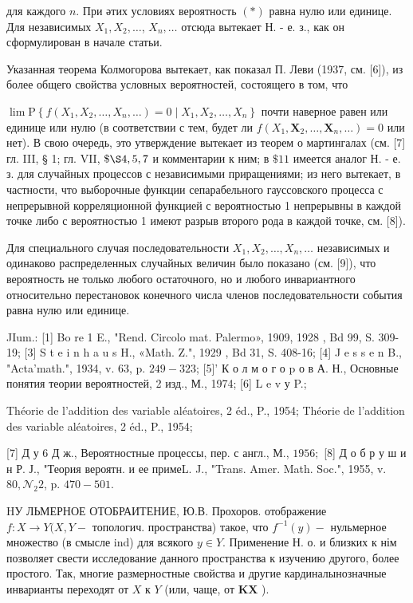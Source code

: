 \documentclass[10pt]{article}
\begin{document}
для каждого $n$. При әтих условиях вероятность $(*)$ равна нулю или единице. Для независимых $X_{1}, X_{2}, \ldots$, $X_{n}, \ldots$ отсюда вытекает Н. - е. з., как он сформулирован в начале статьи.



Указанная теорема Колмогорова вытекает, как показал П. Леви (1937, см. [6]), из более общего свойства условных вероятностей, состоящего в том, что



$\lim \mathrm{P}\left\{f\left(X_{1}, X_{2}, \ldots, X_{n}, \ldots\right)=0 \mid X_{1}, X_{2}, \ldots, X_{n}\right\}$ почти наверное равен или единице или нулю (в соответствии с тем, будет ли $f\left(X_{1}, \boldsymbol{X}_{2}, \ldots, \boldsymbol{X}_{n}, \ldots\right)=0$ или нет). В свою очередь, это утверждение вытекает из теорем о мартингалах (см. [7] гл. III, § 1; гл. VII, $\$ \S 4,5,7$ и комментарии к ним; в $\$ 11$ имеется аналог Н. - е. з. для случайных процессов с независимыми приращениями; из него вытекает, в частности, что выборочные функции сепарабельного гауссовского процесса с непрерывной корреляционной функцией с вероятностью 1 непрерывны в каждой точке либо с вероятностью 1 имеют разрыв второго рода в каждой точке, см. [8]).



Для специального случая последовательности $X_{1}, X_{2}, \ldots, X_{n}, \ldots$ независимых и одинаково распределенных случайных величин было показано (см. [9]), что вероятность не только любого остаточного, но и любого инвариантного относительно перестановок конечного числа членов последовательности события равна нулю или единице.



JIum.: [1] Bo re 1 E., "Rend. Circolo mat. Palermo», 1909, 1928 , Bd 99, S. 309-19; [3] S t e i n h a u s H., «Math. Z.", 1929 , Bd 31, S. 408-16; [4] J e s s e n B., "Acta'math.", 1934, v. 63, p. $249-323$; [5]' К о л м о г о p о в А. Н., Основные понятия теории вероятностей, 2 изд., М., 1974; [6] L e v у P.;

Théorie de l'addition des variable aléatoires, 2 éd., P., 1954; Théorie de l'addition des variable aléatoires, 2 éd., P., 1954;

[7] Д у 6 Д ж., Вероятностные процессы, пер. с англ., М., $1956 ;$ [8] Д о б р у ш и н Р. Ј., "Теория вероятн. и ее примеL. J., "Trans. Amer. Math. Soc.", 1955, v. $80, \mathcal{N}_{2} 2$, p. $470-501$.



HУ ЛЬМЕРНОЕ ОТОБРАИТЕНИЕ, Ю.В. Прохоров. отображение $f: X \rightarrow Y(X, Y-$ топологич. пространства) такое, что $f^{-1}(y)-$ нульмерное множество (в смысле ind) для всякого $y \in Y$. Применение Н. о. и близких к нім позволяет свести исследование данного пространства к изучению другого, более простого. Так, многие размерностные свойства и другие кардиналынозначные инварианты переходят от $X$ к $Y$ (или, чаще, от $\boldsymbol{K} \boldsymbol{X}$ ).
\end{document}

